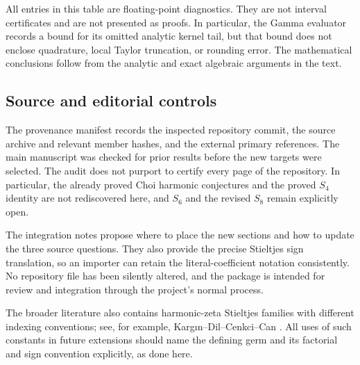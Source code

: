 \documentclass[11pt,a4paper]{article}
\numberwithin{equation}{section}
\theoremstyle{definition}
\begin{document}
All entries in this table are floating-point diagnostics. They are
not interval certificates and are not presented as proofs. In
particular, the Gamma evaluator records a bound for its omitted
analytic kernel tail, but that bound does not enclose quadrature,
local Taylor truncation, or rounding error. The mathematical
conclusions follow from the analytic and exact algebraic arguments
in the text.

\subsection{Source and editorial controls}

The provenance manifest records the inspected repository commit,
the source archive and relevant member hashes, and the external
primary references. The main manuscript was checked for prior
results before the new targets were selected. The audit does not
purport to certify every page of the repository. In particular,
the already proved Choi harmonic conjectures and the proved $S_4$
identity are not rediscovered here, and $S_6$ and the revised $S_8$
remain explicitly open.

The integration notes propose where to place the new sections and
how to update the three source questions. They also provide the
precise Stieltjes sign translation, so an importer can retain the
literal-coefficient notation consistently. No repository file has
been silently altered, and the package is intended for review and
integration through the project's normal process.

The broader literature also contains harmonic-zeta Stieltjes
families with different indexing conventions; see, for example,
Karg\i n--Dil--Cenkci--Can \cite{Kargin}. All uses of such constants
in future extensions should name the defining germ and its
factorial and sign convention explicitly, as done here.

\end{document}
